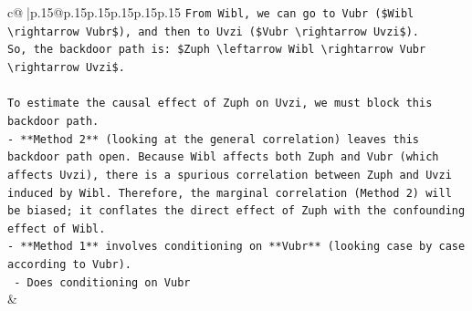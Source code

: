\documentclass{article}
\begin{document}
{\begin{supertabular}{c@{$\;$}|p{.15\linewidth}@{}p{.15\linewidth}p{.15\linewidth}p{.15\linewidth}p{.15\linewidth}p{.15\linewidth}}
{{{\texttt{From Wibl, we can go to Vubr (\$Wibl \textbackslash{}rightarrow Vubr\$), and then to Uvzi (\$Vubr \textbackslash{}rightarrow Uvzi\$).} \\
\texttt{So, the backdoor path is: \$Zuph \textbackslash{}leftarrow Wibl \textbackslash{}rightarrow Vubr \textbackslash{}rightarrow Uvzi\$.} \\
\\ 
\texttt{To estimate the causal effect of Zuph on Uvzi, we must block this backdoor path.} \\
\texttt{{-} **Method 2** (looking at the general correlation) leaves this backdoor path open. Because Wibl affects both Zuph and Vubr (which affects Uvzi), there is a spurious correlation between Zuph and Uvzi induced by Wibl. Therefore, the marginal correlation (Method 2) will be biased; it conflates the direct effect of Zuph with the confounding effect of Wibl.} \\
\texttt{{-} **Method 1** involves conditioning on **Vubr** (looking case by case according to Vubr).} \\
\texttt{  {-} Does conditioning on Vubr} \\
            }
        }
    }
    & \\ \\


\end{supertabular}}
\end{document}

